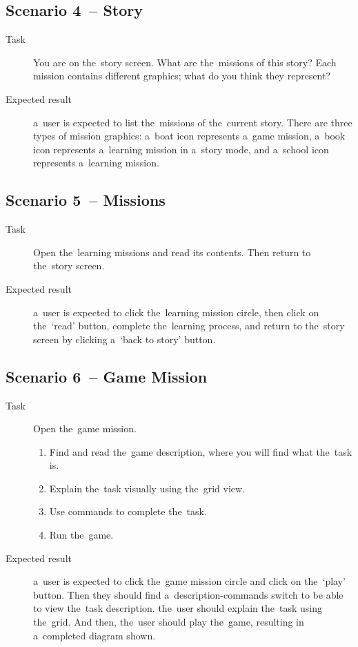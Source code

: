 \subsection*{Scenario 4~-- Story}

\begin{description}
    \item[Task] You are on the~story screen.
    What are the~missions of this story?
    Each mission contains different graphics; what do you think they represent?
    \item[Expected result] a~user is expected to list the~missions of the~current story.
    There are three types of mission graphics: a~boat icon represents a~game mission, a~book icon represents a~learning mission in a~story mode, and a~school icon represents a~learning mission.
\end{description}

\subsection*{Scenario 5~-- Missions}

\begin{description}
    \item[Task] Open the~learning missions and read its contents.
    Then return to the~story screen.
    \item[Expected result] a~user is expected to click the~learning mission circle, then click on the~\enquote*{read} button, complete the~learning process, and return to the~story screen by clicking a~\enquote*{back to story} button.
\end{description}

\subsection*{Scenario 6~-- Game Mission}

\begin{description}
    \item[Task] Open the~game mission.
    \begin{enumerate}
        \item Find and read the~game description, where you will find what the~task is.
        \item Explain the~task visually using the~grid view.
        \item Use commands to complete the~task.
        \item Run the~game.
    \end{enumerate}
    \item[Expected result] a~user is expected to click the~game mission circle and click on the~\enquote*{play} button.
    Then they should find a~description-commands switch to be able to view the~task description.
    the~user should explain the~task using the~grid.
    And then, the~user should play the~game, resulting in a~completed diagram shown.
\end{description}

